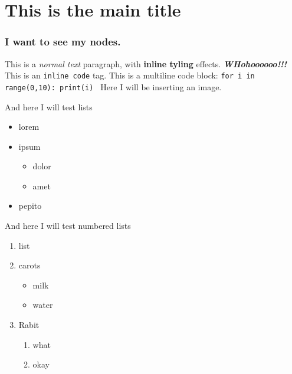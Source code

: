 \part*{This is the main title}\renewcommand{\contentsname}{Sommaire}\tableofcontents\newpage

\section{I want to see my nodes.}
This is a \textit{normal text} paragraph, with \textbf{inline tyling} effects.
\textbf{\textit{WHohoooooo!!!}}
This is an \texttt{inline code} tag.
This is a multiline code block:
\texttt{for i in range(0,10):
    print(i)
}
Here I will be inserting an image.

And here I will test lists

\begin{itemize}

\item lorem

\item ipsum
\begin{itemize}

\item dolor

\item amet

\end{itemize}



\item pepito

\end{itemize}

And here I will test numbered lists

\begin{enumerate}

\item list

\item carots
\begin{itemize}

\item milk

\item water

\end{itemize}



\item Rabit
\begin{enumerate}

\item what

\item okay

\end{enumerate}



\end{enumerate}

